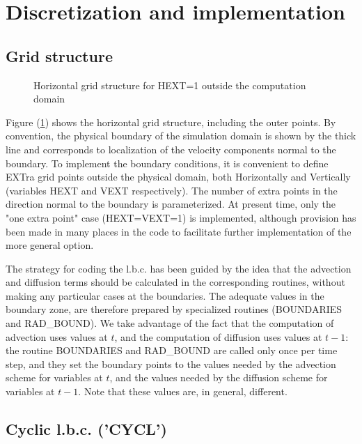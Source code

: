 \section{Discretization and implementation}

\subsection{Grid structure}

\begin{figure}[pbh]
\caption{Horizontal grid structure for HEXT=1  outside the computation domain
\label{horzgrdlbc} }
\end{figure}

Figure (\ref{horzgrdlbc}) shows the horizontal grid structure, including the
outer points. By convention, the physical boundary of the simulation domain
is shown by the
thick line and corresponds to localization of the velocity components normal to
the boundary. To implement the boundary conditions, it is convenient to
define EXTra grid points outside the physical domain, both Horizontally and
Vertically (variables HEXT and VEXT respectively). The number of extra points
in the direction normal to the boundary is parameterized. At present time,
only the "one extra point" case (HEXT=VEXT=1) is implemented, although
provision has been made in many places in the code to facilitate further
implementation of the more general option.

The strategy for coding the l.b.c. has been guided by the idea that
the advection and diffusion terms should be calculated in the corresponding
routines, without making any particular cases at the boundaries.
The adequate values in the boundary zone, are therefore prepared by
specialized routines (BOUNDARIES and RAD\_BOUND). We take advantage of the
fact that the computation of advection uses values at $t$, and the
computation of diffusion uses values at $t-1$: the routine BOUNDARIES and
RAD\_BOUND are called only once per time step, and they set the boundary
points to the values needed by the advection scheme for variables at $t$,
and the values needed by the diffusion scheme for variables at $t-1$. Note
that these values are, in general, different.



\subsection{Cyclic l.b.c. ('CYCL')}

